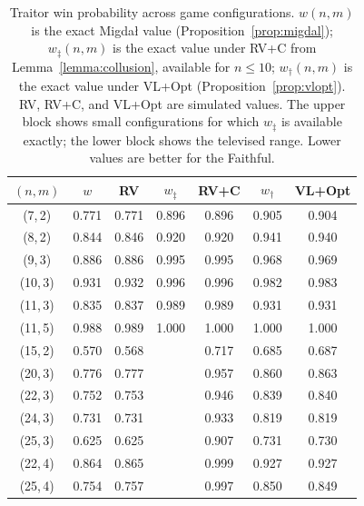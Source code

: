 \documentclass[11pt,a4paper]{article}
\begin{document}
\begin{table}[htbp!]
\centering
\caption{Traitor win probability across game configurations.
\(w(n,m)\) is the exact Migda\l{} value
(Proposition~\ref{prop:migdal}); \(w_{\ddagger}(n,m)\) is the exact
value under RV+C from Lemma~\ref{lemma:collusion}, available for
\(n \leq 10\); \(w_{\dagger}(n,m)\) is the exact value under
VL+Opt (Proposition~\ref{prop:vlopt}). RV, RV+C, and VL+Opt are
simulated values. The upper block shows small configurations for which
\(w_{\ddagger}\) is available exactly; the lower block shows the
televised range. Lower values are better for the Faithful.}
\label{tab:paramsweep}
\smallskip
\begin{tabular}{@{}ccccccc@{}}
\toprule
\((n, m)\) & \(w\) & RV & \(w_{\ddagger}\) & RV+C & \(w_{\dagger}\) & VL+Opt \\
\midrule
(7,\,2) & 0.771 & 0.771 & 0.896 & 0.896 & 0.905 & 0.904 \\
(8,\,2) & 0.844 & 0.846 & 0.920 & 0.920 & 0.941 & 0.940 \\
(9,\,3) & 0.886 & 0.886 & 0.995 & 0.995 & 0.968 & 0.969 \\
(10,\,3) & 0.931 & 0.932 & 0.996 & 0.996 & 0.982 & 0.983 \\
(11,\,3) & 0.835 & 0.837 & 0.989 & 0.989 & 0.931 & 0.931 \\
(11,\,5) & 0.988 & 0.989 & 1.000 & 1.000 & 1.000 & 1.000 \\
\midrule
(15,\,2) & 0.570 & 0.568 & \text{--} & 0.717 & 0.685 & 0.687 \\
(20,\,3) & 0.776 & 0.777 & \text{--} & 0.957 & 0.860 & 0.863 \\
(22,\,3) & 0.752 & 0.753 & \text{--} & 0.946 & 0.839 & 0.840 \\
(24,\,3) & 0.731 & 0.731 & \text{--} & 0.933 & 0.819 & 0.819 \\
(25,\,3) & 0.625 & 0.625 & \text{--} & 0.907 & 0.731 & 0.730 \\
(22,\,4) & 0.864 & 0.865 & \text{--} & 0.999 & 0.927 & 0.927 \\
(25,\,4) & 0.754 & 0.757 & \text{--} & 0.997 & 0.850 & 0.849 \\
\bottomrule
\end{tabular}

\end{table}
\end{document}
